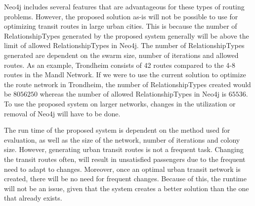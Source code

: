 Neo4j includes several features that are advantageous for these types of routing problems. However, the proposed solution as-is will not be possible to use for optimizing transit routes in large urban cities. This is because the number of RelationshipTypes generated by the proposed system generally will be above the limit of allowed RelationshipTypes in Neo4j. The number of RelationshipTypes generated are dependent on the swarm size, number of iterations and allowed routes. As an example, Trondheim consists of 42 routes compared to the 4-8 routes in the Mandl Network. If we were to use the current solution to optimize the route network in Trondheim, the number of RelationshipTypes created would be $8056250$ whereas the number of allowed RelationshipTypes in Neo4j is $65536$. To use the proposed system on larger networks, changes in the utilization or removal of Neo4j will have to be done. 

The run time of the proposed system is dependent on the method used for evaluation, as well as the size of the network, number of iterations and colony size. However, generating urban transit routes is not a frequent task. Changing the transit routes often, will result in unsatisfied passengers due to the frequent need to adapt to changes. Moreover, once an optimal urban transit network is created, there will be no need for frequent changes. Because of this, the runtime will not be an issue, given that the system creates a better solution than the one that already exists. 


